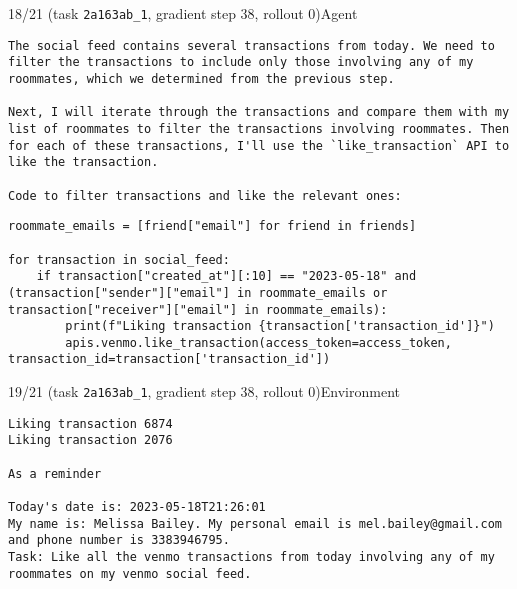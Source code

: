 \begin{minipage}{0.95\linewidth}
\begin{assistant_message_box}{{18/21 (task \texttt{2a163ab\_1}, gradient step 38, rollout 0)\hfill Agent}}
\scriptsize
\begin{Verbatim}[breaklines]
The social feed contains several transactions from today. We need to filter the transactions to include only those involving any of my roommates, which we determined from the previous step. 

Next, I will iterate through the transactions and compare them with my list of roommates to filter the transactions involving roommates. Then for each of these transactions, I'll use the `like_transaction` API to like the transaction.

Code to filter transactions and like the relevant ones:
\end{Verbatim}
\begin{tcolorbox}[colback=codebgcolor,boxrule=0pt]\begin{Verbatim}[breaklines]
roommate_emails = [friend["email"] for friend in friends]

for transaction in social_feed:
    if transaction["created_at"][:10] == "2023-05-18" and (transaction["sender"]["email"] in roommate_emails or transaction["receiver"]["email"] in roommate_emails):
        print(f"Liking transaction {transaction['transaction_id']}")
        apis.venmo.like_transaction(access_token=access_token, transaction_id=transaction['transaction_id'])
\end{Verbatim}
\end{tcolorbox}\end{assistant_message_box}
\end{minipage}

\hspace*{8mm}%
\begin{minipage}{0.95\linewidth}
\begin{user_message_box}{{19/21 (task \texttt{2a163ab\_1}, gradient step 38, rollout 0)\hfill Environment}}
\scriptsize
\begin{Verbatim}[breaklines]
Liking transaction 6874
Liking transaction 2076

As a reminder

Today's date is: 2023-05-18T21:26:01
My name is: Melissa Bailey. My personal email is mel.bailey@gmail.com and phone number is 3383946795.
Task: Like all the venmo transactions from today involving any of my roommates on my venmo social feed.
\end{Verbatim}
\end{user_message_box}
\end{minipage}

